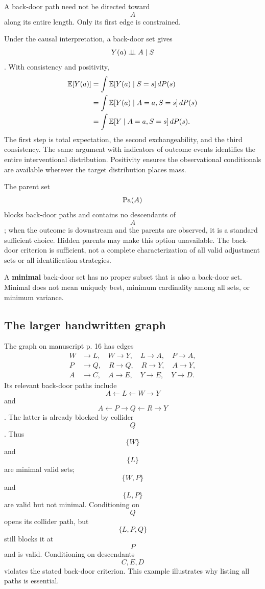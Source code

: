 A back-door path need not be directed toward $$A$$ along its entire length. Only its first edge is constrained.
\begin{supplement}
Under the causal interpretation, a back-door set gives $$Y(a)\mathrel{\perp\!\!\!\perp} A\mid S$$. With consistency and positivity,
\begin{align}
\mathbb E[Y(a)]&=\int\mathbb E[Y(a)\mid S=s]\,dP(s)\\
&=\int\mathbb E[Y(a)\mid A=a,S=s]\,dP(s)\\
&=\int\mathbb E[Y\mid A=a,S=s]\,dP(s).
\end{align}
The first step is total expectation, the second exchangeability, and the third consistency. The same argument with indicators of outcome events identifies the entire interventional distribution. Positivity ensures the observational conditionals are available wherever the target distribution places mass.
\end{supplement}
The parent set $$\operatorname{Pa}(A)$$ blocks back-door paths and contains no descendants of $$A$$; when the outcome is downstream and the parents are observed, it is a standard sufficient choice. Hidden parents may make this option unavailable. The back-door criterion is sufficient, not a complete characterization of all valid adjustment sets or all identification strategies.

A \textbf{minimal} back-door set has no proper subset that is also a back-door set. Minimal does not mean uniquely best, minimum cardinality among all sets, or minimum variance.
\subsection{The larger handwritten graph}
The graph on manuscript p. 16 has edges
\begin{align}
W&\to L,\quad W\to Y,\quad L\to A,\quad P\to A,\\
P&\to Q,\quad R\to Q,\quad R\to Y,\quad A\to Y,\\
A&\to C,\quad A\to E,\quad Y\to E,\quad Y\to D.
\end{align}
Its relevant back-door paths include $$A\leftarrow L\leftarrow W\to Y$$ and $$A\leftarrow P\to Q\leftarrow R\to Y$$. The latter is already blocked by collider $$Q$$.
Thus $$\{W\}$$ and $$\{L\}$$ are minimal valid sets; $$\{W,P\}$$ and $$\{L,P\}$$ are valid but not minimal. Conditioning on $$Q$$ opens its collider path, but $$\{L,P,Q\}$$ still blocks it at $$P$$ and is valid. Conditioning on descendants $$C,E,D$$ violates the stated back-door criterion. This example illustrates why listing all paths is essential.


